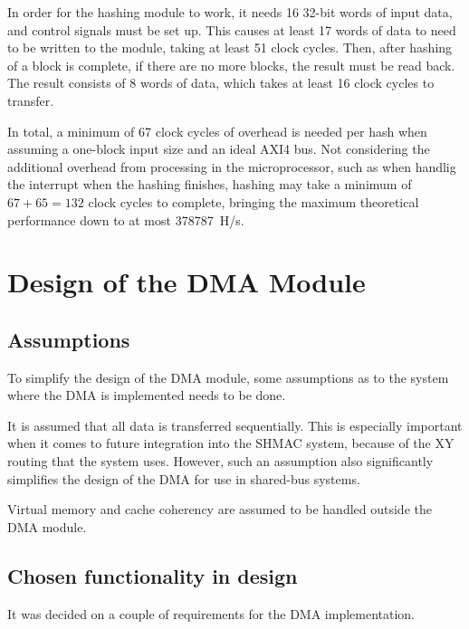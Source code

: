 In order for the hashing module to work, it needs 16 32-bit words of input data,
and control signals must be set up. This causes at least 17 words of data to
need to be written to the module, taking at least 51 clock cycles. Then, after
hashing of a block is complete, if there are no more blocks, the result must
be read back. The result consists of 8 words of data, which takes at least 16
clock cycles to transfer.

In total, a minimum of 67 clock cycles of overhead is needed per hash when assuming
a one-block input size and an ideal AXI4 bus. Not considering the additional overhead
from processing in the microprocessor, such as when handlig the interrupt when the
hashing finishes, hashing may take a minimum of $67 + 65 = 132$ clock cycles to
complete, bringing the maximum theoretical performance down to at most 378787~H/s.

\section{Design of the DMA Module}
\label{sec:dma-architecture}

\subsection{Assumptions}
To simplify the design of the DMA module, some assumptions as to the system where the
DMA is implemented needs to be done.

It is assumed that all data is transferred sequentially. 
This is especially important when it comes to future integration into the SHMAC system, because of the XY routing that the system uses.
However, such an assumption also significantly simplifies the design of the DMA for use in shared-bus systems.

Virtual memory and cache coherency are assumed to be handled outside the  DMA module.

\subsection{Chosen functionality in design}

It was decided on a couple of requirements for the DMA implementation.


